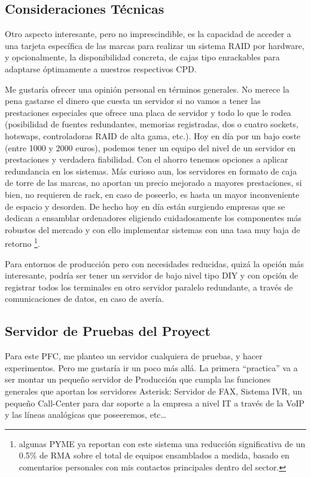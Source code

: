 \subsection{Consideraciones Técnicas}

Otro aspecto interesante, pero no imprescindible, es la capacidad de acceder a una tarjeta específica de las marcas para realizar un sistema RAID por hardware, y opcionalmente, la disponibilidad concreta, de cajas tipo enrackables para adaptarse óptimamente a nuestros respectivos CPD.

Me gustaría ofrecer una opinión personal en términos generales. No merece la pena gastarse el dinero que cuesta un servidor si no vamos a tener las prestaciones especiales que ofrece una placa de servidor y todo lo que le rodea (posibilidad de fuentes redundantes, memorias registradas, dos o cuatro sockets, hotswaps, controladoras RAID de alta gama, etc.). Hoy en día por un bajo coste (entre 1000 y 2000 euros), podemos tener un equipo del nivel de un servidor en prestaciones y verdadera fiabilidad. Con el ahorro tenemos opciones a aplicar redundancia en los sistemas. Más curioso aun, los servidores en formato de caja de torre de las marcas, no aportan un precio mejorado a mayores prestaciones, si bien, no requieren de rack, en caso de poseerlo, es hasta un mayor inconveniente de espacio y desorden. De hecho hoy en día están surgiendo empresas que se dedican a ensamblar ordenadores eligiendo cuidadosamente los componentes más robustos del mercado y con ello implementar sistemas con una tasa muy baja de retorno \footnote{algunas PYME ya reportan con este sistema una reducción significativa de un 0.5\% de RMA sobre el total de equipos ensamblados a medida, basado en comentarios personales con mis contactos principales dentro del sector.}.

Para entornos de producción pero con necesidades reducidas, quizá la opción más interesante, podría ser tener un servidor de bajo nivel tipo DIY y con opción de registrar todos los terminales en otro servidor paralelo redundante, a través de comunicaciones de datos, en caso de avería.

\subsection{Servidor de Pruebas del Proyect}

Para este PFC, me planteo un servidor cualquiera de pruebas, y hacer experimentos. Pero me gustaría ir un poco más allá. La primera “practica” va a ser montar un pequeño servidor de Producción que cumpla las funciones generales que aportan los servidores Asterisk: Servidor de FAX, Sistema IVR, un pequeño Call-Center para dar soporte a la empresa a nivel IT a través de la VoIP y las líneas analógicas que poseeremos, etc…

